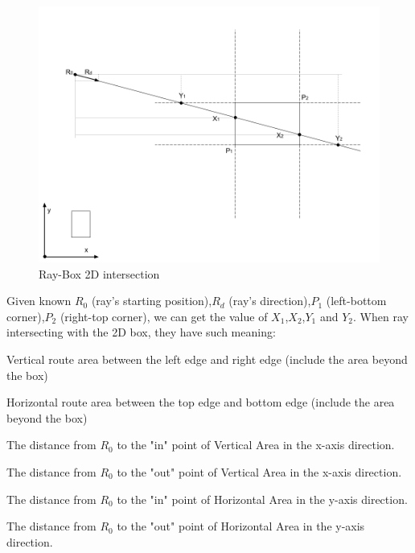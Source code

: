 \begin{figure}[H]
\caption{Ray-Box 2D intersection}
\label{fig:ray-box-2d}
\centering
\includegraphics[width=\textwidth, keepaspectratio]{Figures/ray-box-2d-intersection.png}
\decoRule
\end{figure}

Given known $R_0$ (ray's starting position),\enspace$R_d$ (ray's direction),\enspace$P_1$ (left-bottom corner),\enspace$P_2$ (right-top corner), we can get the value of $X_1$,\enspace$X_2$,\enspace$Y_1$ and $Y_2$. When ray intersecting with the 2D box, they have such meaning:

\begin{description}
	\setlength{\parskip}{0pt}
	\item[$\bullet$ Vertical Area] Vertical route area between the left edge and right edge (include the area beyond the box)
	\item[$\bullet$ Horizontal Area] Horizontal route area between the top edge and bottom edge (include the area beyond the box)
	\item[$\bullet$ $\mathbf{X}_1$] The distance from $R_0$ to the "in" point of Vertical Area in the x-axis direction.   
	\item[$\bullet$ $\mathbf{X}_2$] The distance from $R_0$ to the "out" point of Vertical Area in the x-axis direction. 
	\item[$\bullet$ $\mathbf{Y}_1$] The distance from $R_0$ to the "in" point of Horizontal Area in the y-axis direction.
	\item[$\bullet$ $\mathbf{Y}_2$] The distance from $R_0$ to the "out" point of Horizontal Area in the y-axis direction. 
\end{description}

